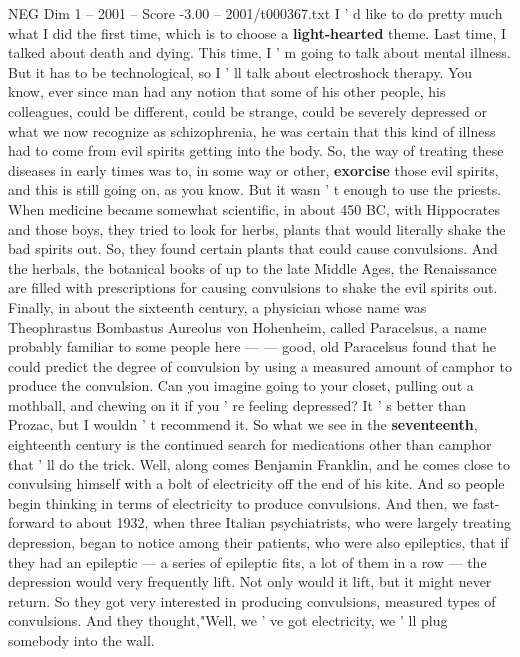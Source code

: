 \begin{textsample}{NEG Dim 1 – 2001 – Score -3.00 – 2001/t000367.txt}  \label{ex:f1_neg_003}
I ' d like to do pretty much what I did the first time, which is to choose a \textbf{light-hearted} theme.
Last time, I talked about death and dying.
This time, I ' m going to talk about mental illness.
But it has to be technological, so I ' ll talk about electroshock therapy.
You know, ever since man had any notion that some of his other people, his colleagues, could be different, could be strange, could be severely depressed or what we now recognize as schizophrenia, he was certain that this kind of illness had to come from evil spirits getting into the body.
So, the way of treating these diseases in early times was to, in some way or other, \textbf{exorcise} those evil spirits, and this is still going on, as you know.
But it wasn ' t enough to use the priests.
When medicine became somewhat scientific, in about 450 BC, with Hippocrates and those boys, they tried to look for herbs, plants that would literally shake the bad spirits out.
So, they found certain plants that could cause convulsions.
And the herbals, the botanical books of up to the late Middle Ages, the Renaissance are filled with prescriptions for causing convulsions to shake the evil spirits out.
Finally, in about the sixteenth century, a physician whose name was Theophrastus Bombastus Aureolus von Hohenheim, called Paracelsus, a name probably familiar to some people here — — good, old Paracelsus found that he could predict the degree of convulsion by using a measured amount of camphor to produce the convulsion.
Can you imagine going to your closet, pulling out a mothball, and chewing on it if you ' re feeling depressed?
It ' s better than Prozac, but I wouldn ' t recommend it.
So what we see in the \textbf{seventeenth}, eighteenth century is the continued search for medications other than camphor that ' ll do the trick.
Well, along comes Benjamin Franklin, and he comes close to convulsing himself with a bolt of electricity off the end of his kite.
And so people begin thinking in terms of electricity to produce convulsions.
And then, we fast-forward to about 1932, when three Italian psychiatrists, who were largely treating depression, began to notice among their patients, who were also epileptics, that if they had an epileptic — a series of epileptic fits, a lot of them in a row — the depression would very frequently lift.
Not only would it lift, but it might never return.
So they got very interested in producing convulsions, measured types of convulsions.
And they thought,"Well, we ' ve got electricity, we ' ll plug somebody into the wall.

\end{textsample}

